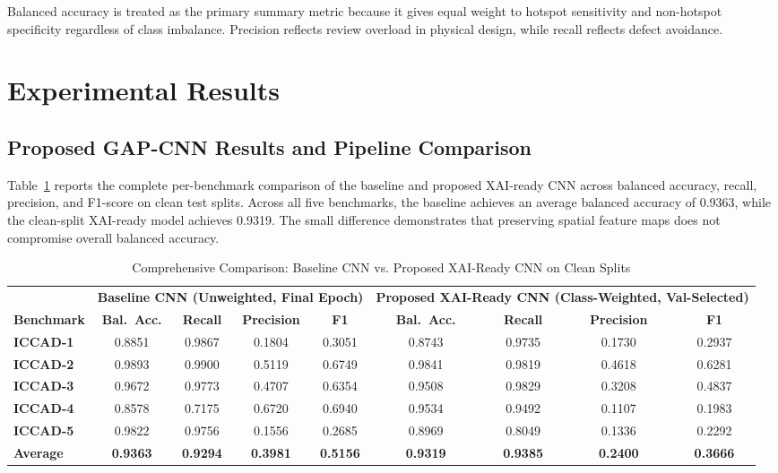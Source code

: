 \documentclass[conference]{IEEEtran}
\begin{document}
Balanced accuracy is treated as the primary summary metric because it gives equal weight to hotspot sensitivity and non-hotspot specificity regardless of class imbalance. Precision reflects review overload in physical design, while recall reflects defect avoidance.

\section{Experimental Results}

\subsection{Proposed GAP-CNN Results and Pipeline Comparison}
Table~\ref{tab:main_results} reports the complete per-benchmark comparison of the baseline and proposed XAI-ready CNN across balanced accuracy, recall, precision, and F1-score on clean test splits. Across all five benchmarks, the baseline achieves an average balanced accuracy of 0.9363, while the clean-split XAI-ready model achieves 0.9319. The small difference demonstrates that preserving spatial feature maps does not compromise overall balanced accuracy.

\begin{table}[t]
\caption{Comprehensive Comparison: Baseline CNN vs. Proposed XAI-Ready CNN on Clean Splits}
\label{tab:main_results}
\centering
\begin{tabular}{lcccccccc}
\toprule
 & \multicolumn{4}{c}{\textbf{Baseline CNN (Unweighted, Final Epoch)}} & \multicolumn{4}{c}{\textbf{Proposed XAI-Ready CNN (Class-Weighted, Val-Selected)}} \\
\cmidrule(lr){2-5} \cmidrule(lr){6-9}
\textbf{Benchmark} & \textbf{Bal.~Acc.} & \textbf{Recall} & \textbf{Precision} & \textbf{F1} & \textbf{Bal.~Acc.} & \textbf{Recall} & \textbf{Precision} & \textbf{F1} \\
\midrule
\textbf{ICCAD-1} & 0.8851 & 0.9867 & 0.1804 & 0.3051 & 0.8743 & 0.9735 & 0.1730 & 0.2937 \\
\textbf{ICCAD-2} & 0.9893 & 0.9900 & 0.5119 & 0.6749 & 0.9841 & 0.9819 & 0.4618 & 0.6281 \\
\textbf{ICCAD-3} & 0.9672 & 0.9773 & 0.4707 & 0.6354 & 0.9508 & 0.9829 & 0.3208 & 0.4837 \\
\textbf{ICCAD-4} & 0.8578 & 0.7175 & 0.6720 & 0.6940 & 0.9534 & 0.9492 & 0.1107 & 0.1983 \\
\textbf{ICCAD-5} & 0.9822 & 0.9756 & 0.1556 & 0.2685 & 0.8969 & 0.8049 & 0.1336 & 0.2292 \\
\midrule
\textbf{Average} & \textbf{0.9363} & \textbf{0.9294} & \textbf{0.3981} & \textbf{0.5156} & \textbf{0.9319} & \textbf{0.9385} & \textbf{0.2400} & \textbf{0.3666} \\
\bottomrule
\end{tabular}
\end{table}
\end{document}

